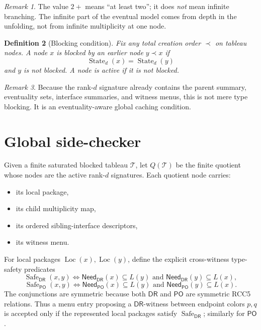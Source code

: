 \documentclass[11pt]{article}
\newtheorem{definition}{Definition}[section]
\theoremstyle{remark}
\newtheorem{remark}[definition]{Remark}
\newcommand{\DR}{\mathsf{DR}}
\newcommand{\PO}{\mathsf{PO}}
\newcommand{\State}{\operatorname{State}}
\newcommand{\Loc}{\operatorname{Loc}}
\newcommand{\Safe}{\operatorname{Safe}}
\newcommand{\NeedDR}{\mathsf{Need}_{\DR}}
\newcommand{\NeedPO}{\mathsf{Need}_{\PO}}
\begin{document}
\begin{remark}
The value $2+$ means ``at least two''; it does \emph{not} mean infinite branching. The infinite part of the eventual model comes from depth in the unfolding, not from infinite multiplicity at one node.
\end{remark}

\begin{definition}[Blocking condition]\label{def:blocking}
Fix any total creation order $\prec$ on tableau nodes. A node $x$ is \emph{blocked} by an earlier node $y\prec x$ if
\[
\State_d(x)=\State_d(y)
\]
and $y$ is not blocked. A node is \emph{active} if it is not blocked.
\end{definition}

\begin{remark}
Because the rank-$d$ signature already contains the parent summary, eventuality sets, interface summaries, and witness menus, this is not mere type blocking. It is an eventuality-aware global caching condition.
\end{remark}

\section{Global side-checker}\label{sec:global-check}

Given a finite saturated blocked tableau $\mathcal T$, let $Q(\mathcal T)$ be the finite quotient whose nodes are the active rank-$d$ signatures. Each quotient node carries:
\begin{itemize}
    \item its local package,
    \item its child multiplicity map,
    \item its ordered sibling-interface descriptors,
    \item its witness menu.
\end{itemize}
For local packages $\Loc(x),\Loc(y)$, define the explicit cross-witness type-safety predicates
\[
\Safe_{\DR}(x,y)\iff \NeedDR(x)\subseteq L(y)\text{ and }\NeedDR(y)\subseteq L(x),
\]
\[
\Safe_{\PO}(x,y)\iff \NeedPO(x)\subseteq L(y)\text{ and }\NeedPO(y)\subseteq L(x).
\]
The conjunctions are symmetric because both $\DR$ and $\PO$ are symmetric RCC5 relations. Thus a menu entry proposing a $\DR$-witness between endpoint colors $p,q$ is accepted only if the represented local packages satisfy $\Safe_{\DR}$; similarly for $\PO$.
\end{document}
